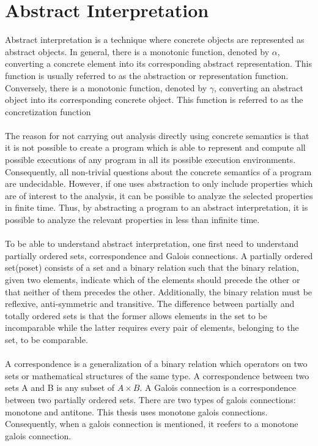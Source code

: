 \documentclass{kththesis}
\begin{document}
\section{Abstract Interpretation}\label{sec:AbsInt}
Abstract interpretation is a technique where concrete objects are represented as abstract objects. In general, there is a monotonic function, denoted by $\alpha$, converting a concrete element into its corresponding abstract representation. This function is usually referred to as the abstraction or representation function. Conversely, there is a monotonic function, denoted by $\gamma$, converting an abstract object into its corresponding concrete object. This function is referred to as the concretization function
\\ \\%
The reason for not carrying out analysis directly using concrete semantics is that it is not possible to create a program which is able to represent and compute all possible executions of any program in all its possible execution environments\parencite{FRPatrick}. Consequently, all non-trivial questions about the concrete semantics of a program are undecidable. However, if one uses abstraction to only include properties which are of interest to the analysis, it can be possible to analyze the selected properties in finite time. Thus, by abstracting a program to an abstract interpretation, it is possible to analyze the relevant properties in less than infinite time.
\\ \\
To be able to understand abstract interpretation, one first need to understand partially ordered sets\parencite{EoMPoset}, correspondence\parencite{EoMCorrespondence} and Galois connections\cite{galoisConnections}. A partially ordered set(poset) consists of a set and a binary relation such that the binary relation, given two elements, indicate which of the elements should precede the other or that neither of them precedes the other. Additionally, the binary relation must be reflexive, anti-symmetric and transitive. The difference between partially and totally ordered sets is that the former allows elements in the set to be incomparable while the latter requires every pair of elements, belonging to the set, to be comparable.
\\ \\
A correspondence is a generalization of a binary relation which operators on two sets or mathematical structures of the same type. A correspondence between two sets A and B is any subset of $A \times B$. A Galois connection is a correspondence between two partially ordered sets. There are two types of galois connections: monotone and antitone. This thesis uses monotone galois connections. Consequently, when a galois connection is mentioned, it reefers to a monotone galois connection.
\end{document}
